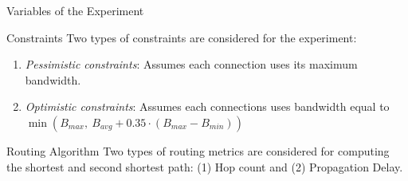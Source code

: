 \begin{section}{Variables of the Experiment}
    \begin{subsection}{Constraints}
        Two types of constraints are considered for the experiment:
        \begin{enumerate}
            \item \textit{Pessimistic constraints}: Assumes each connection uses its maximum bandwidth.
            \item \textit{Optimistic constraints}: Assumes each connections uses bandwidth equal to \\ $\min\left(B_{max},\ B_{avg} + 0.35 \cdot (B_{max} - B_{min}) \right)$
        \end{enumerate}
    \end{subsection}

    \begin{subsection}{Routing Algorithm}
        Two types of routing metrics are considered for computing the shortest and second shortest path: (1) Hop count and (2) Propagation Delay.
    \end{subsection}

\end{section}

